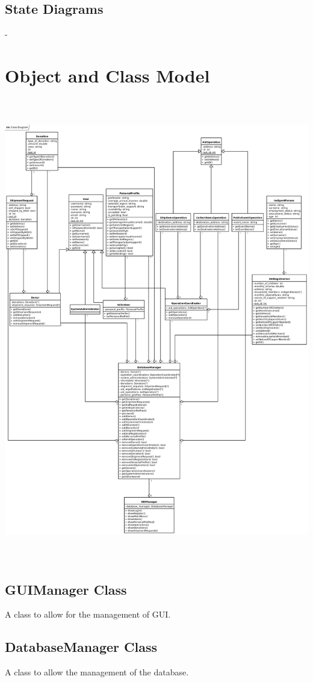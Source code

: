 \documentclass[a4paper,12pt]{report}
\begin{document}
		\subsection{State Diagrams}
			-
	\section{Object and Class Model}
		\includegraphics[width=414pt,height=575pt]{class_diagram.png}
		\subsection{GUIManager Class}
			A class to allow for the management of GUI.
		\subsection{DatabaseManager Class}
			A class to allow the management of the database.
\end{document}
